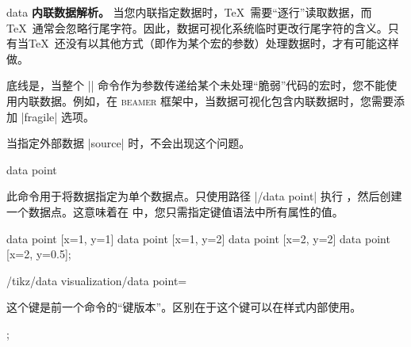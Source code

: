 \begin{datavisualizationoperation}{data}{}
    \textbf{内联数据解析。} 当您内联指定数据时，\TeX\ 需要``逐行''读取数据，而\TeX\ 通常会忽略行尾字符。因此，数据可视化系统临时更改行尾字符的含义。只有当\TeX\ 还没有以其他方式（即作为某个宏的参数）处理数据时，才有可能这样做。


    底线是，当整个 |\datavisualization| 命令作为参数传递给某个未处理``脆弱''代码的宏时，您不能使用内联数据。例如，在 \textsc{beamer} 框架中，当数据可视化包含内联数据时，您需要添加 |fragile| 选项。


    当指定外部数据 |source| 时，不会出现这个问题。
\end{datavisualizationoperation}

\begin{datavisualizationoperation}{data point}{} %

    此命令用于将数据指定为单个数据点。只使用路径 |/data point| 执行 ，然后创建一个数据点。这意味着在  中，您只需指定键值语法中所有属性的值。
\begin{codeexample}[preamble={\usetikzlibrary{datavisualization}}]
\tikz {}
  data point [x=1, y=1]    data point [x=1, y=2]
  data point [x=2, y=2]    data point [x=2, y=0.5];
\end{codeexample}
\end{datavisualizationoperation}

\begin{key}{/tikz/data visualization/data point=} %

    这个键是前一个命令的``键版本''。区别在于这个键可以在样式内部使用。
\begin{codeexample}[preamble={\usetikzlibrary{datavisualization}}]
\tikz \datavisualization
[ school book axes, visualize as line,
  horizontal=1,
  horizontal=2 ];
\end{codeexample}
\end{key}

